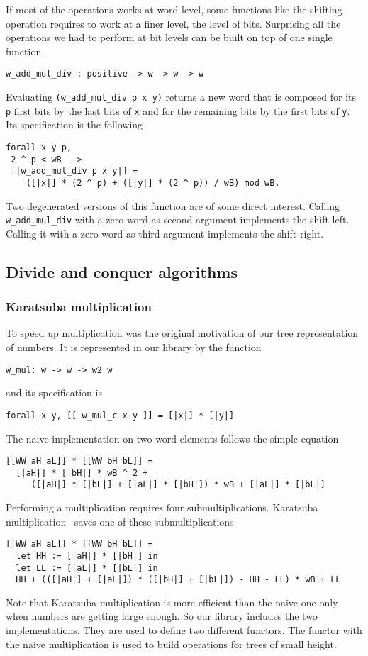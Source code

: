 If most of the operations works at word level, some functions like the
shifting operation requires to work at a finer level, the level of bits.
Surprising all the operations we had to perform at bit levels can be built
on top of  one single function
\begin{verbatim}
w_add_mul_div : positive -> w -> w -> w
\end{verbatim}
Evaluating  {\tt (w\_add\_mul\_div p x y)} returns a new word that
is composed for its {\tt p} first bits by the last bits of {\tt x}
and for the remaining bits by the first bits of {\tt y}.
Its specification is the following
\begin{verbatim}
forall x y p, 
 2 ^ p < wB  ->
 [|w_add_mul_div p x y|] =
    ([|x|] * (2 ^ p) + ([|y|] * (2 ^ p)) / wB) mod wB.
\end{verbatim}
Two degenerated versions of this function are of some direct interest. Calling
{\tt w\_add\_mul\_div} with a zero word as second argument implements
the shift left. Calling it with a zero word as third argument implements
the shift right.

\subsection{Divide and conquer algorithms}

\subsubsection{Karatsuba multiplication}
To speed up multiplication was the original motivation of our 
tree representation of numbers. It is represented in our library
by the function
\begin{verbatim}
w_mul: w -> w -> w2 w
\end{verbatim}
and its specification is
\begin{verbatim}
forall x y, [[ w_mul_c x y ]] = [|x|] * [|y|]
\end{verbatim}
The naive implementation on two-word elements follows the simple equation
\begin{verbatim}
[[WW aH aL]] * [[WW bH bL]] =
  [|aH|] * [|bH|] * wB ^ 2 + 
     ([|aH|] * [|bL|] + [|aL|] * [|bH|]) * wB + [|aL|] * [|bL|]
\end{verbatim}
Performing a multiplication requires four submultiplications.
Karatsuba multiplication~\cite{Karat} saves one of these submultiplications
\begin{verbatim}
[[WW aH aL]] * [[WW bH bL]] =
  let HH := [|aH|] * [|bH|] in
  let LL := [|aL|] * [|bL|] in
  HH + (([|aH|] + [|aL|]) * ([|bH|] + [|bL|]) - HH - LL) * wB + LL
\end{verbatim}
Note that Karatsuba multiplication is more efficient than the naive one
only when numbers are getting large enough. So our library
includes the two implementations. They are used to define two
different functors. The functor with the naive multiplication is used to
build operations for trees of small height. 

